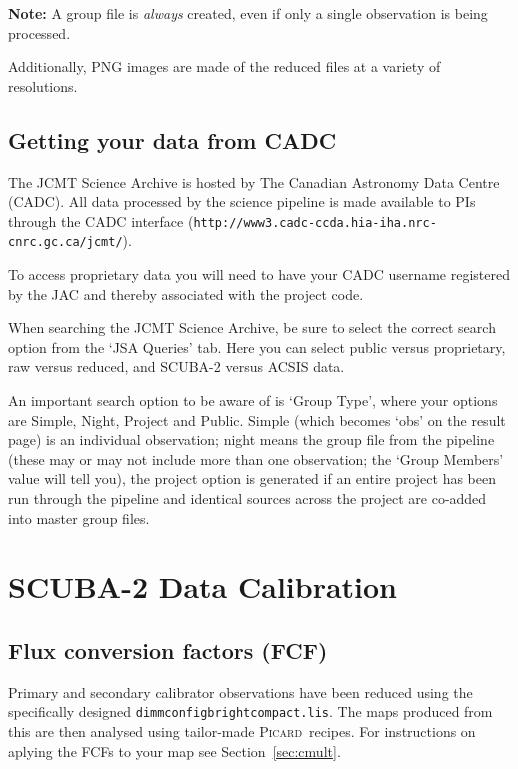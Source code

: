 \documentclass[twoside,11pt]{article}
\newcommand{\xref}[3]{#1}
\newcommand{\xlabel}[1]{}
\renewcommand{\_}{\texttt{\symbol{95}}}
\newcommand{\picard}{\xref{\textsc{Picard}}{sun265}{}}
\begin{document}
\textbf{Note:} A group file is \emph{always} created, even if only a single
observation is being processed.

Additionally, PNG images are made of the reduced files at a variety of
resolutions.

\subsection{\xlabel{cadc}Getting your data from CADC}

The JCMT Science Archive is hosted by The Canadian Astronomy Data
Centre (CADC). All data processed by the science pipeline is made
available to PIs through the CADC interface
(\texttt{http://www3.cadc-ccda.hia-iha.nrc-cnrc.gc.ca/jcmt/}).

To access proprietary data you will need to have your CADC username
registered by the JAC and thereby associated with the project code.

When searching the JCMT Science Archive, be sure to select the correct
search option from the `JSA Queries' tab. Here you can select public
versus proprietary, raw versus reduced, and SCUBA-2 versus ACSIS data.

An important search option to be aware of is `Group Type', where your
options are Simple, Night, Project and Public. Simple (which becomes
`obs' on the result page) is an individual observation; night means
the group file from the pipeline (these may or may not include more
than one observation; the `Group Members' value will tell you), the
project option is generated if an entire project has been run through
the pipeline and identical sources across the project are co-added
into master group files.

\clearpage
\section{\xlabel{calib}SCUBA-2 Data Calibration}
\label{sec:cal}

\subsection{\xlabel{fcf}Flux conversion factors (FCF)}
\label{sec:fcf}

Primary and secondary calibrator observations have been reduced using
the specifically designed \texttt{dimmconfig\_bright\_compact.lis}.
The maps produced from this are then analysed using tailor-made
\picard\ recipes. For instructions on aplying the FCFs to your map see
Section~\ref{sec:cmult}.
\end{document}
